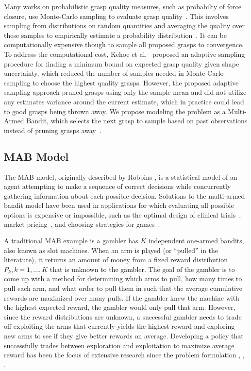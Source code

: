 \documentclass[a4paper, 10pt, conference]{ieeeconf}      %
\begin{document}
Many works on probabilistic grasp quality measures, such as probabilty of force closure, use Monte-Carlo sampling to evaluate grasp quality~\cite{christopoulos2007handling, kehoe2012estimating, kehoe2012toward}.
This involves sampling from distributions on random quantities and averaging the quality over these samples to empirically estimate a probability distribution~\cite{caflisch1998monte}.
It can be computationally expensive though to sample all proposed grasps to convergence.
To address the computational cost, Kehoe et al.~\cite{kehoe2012estimating} proposed an adaptive sampling procedure for finding a minimum bound on expected grasp quality given shape uncertainty, which reduced the number of samples needed in Monte-Carlo sampling to choose the highest quality grasps.
However, the proposed adaptive sampling approach pruned grasps using only the sample mean and did not utilize any estimates variance around the current estimate, which in practice could lead to good grasps being thrown away.
We propose modeling the problem as a Multi-Armed Bandit, which selects the next grasp to sample based on past observations instead of pruning grasps away~\cite{barto1998reinforcement, lai1985asymptotically}.

\subsection{MAB Model}
The MAB model, originally described by Robbins \cite{robbins1985some}, is a statistical model of an agent attempting to make a sequence of correct decisions while concurrently gathering information about each possible decision.
Solutions to the multi-armed bandit model have been used in applications for which evaluating all possible options is expensive or impossible, such as the optimal design of clinical trials~\cite{simon1989optimal}, market pricing~\cite{rothschild1974two}, and choosing strategies for games~\cite{st2012online}. 

A traditional MAB example is a gambler has $K$ independent one-armed bandits, also known as slot machines.
When an arm is played (or ``pulled'' in the literature), it returns an amount of money from a fixed reward distribution $P_k, k = 1, ..., K$ that is unknown to the gambler.
The goal of the gambler is to come up with a method for determining which arms to pull, how many times to pull each arm, and what order to pull them in such that the average cumulative rewards are maximized over many pulls.
If the gambler knew the machine with the highest expected reward, the gambler would only pull that arm.
However, since the reward distributions are unknown, a successful gambler needs to trade off exploiting the arms that currently yields the highest reward and exploring new arms to see if they give better rewards on average.
Developing a policy that successfully trades between exploration and exploitation to maximize average reward has been the focus of extensive research since the problem formulation \cite{bubeck2009pure}, \cite{robbins1985some}, \cite{bergemann2006bandit}.
\end{document}
